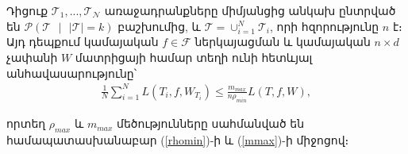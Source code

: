 \documentclass[12pt]{article}
\begin{document}
\begin{lemma}
\label{bs_inequality}
Դիցուք $\mathcal{T}_1, ..., \mathcal{T_N}$ առաջադրանքները միմյանցից անկախ ընտրված են $\mathcal{P}(\mathcal{T} \text{ } |\text{ }  |\mathcal{T}| = k )$ բաշխումից, և $\mathcal{T} = \cup_{i=1}^N{\mathcal{T}_i}$, որի հզորությունը $n$ է։ Այդ դեպքում կամայական $f \in \mathcal{F}$ ներկայացման և  կամայական $n \times d$ չափանի $W$  մատրիցայի համար տեղի ունի հետևյալ անհավասարությունը՝
\begin{align}
\label{mean_task_ineq}
\frac{1}{N}\sum_{i=1}^N L(T_i, f, W_{T_i}) \leq  \frac{m_{max}}{n\rho_{min}}  L(T, f, W) ,
\end{align}

\noindent որտեղ $\rho_{max}$ և $m_{max}$ մեծությունները սահմանված են համապատասխանաբար (\ref{rhomin})-ի և (\ref{mmax})-ի միջոցով։
\end{lemma}
\end{document}
